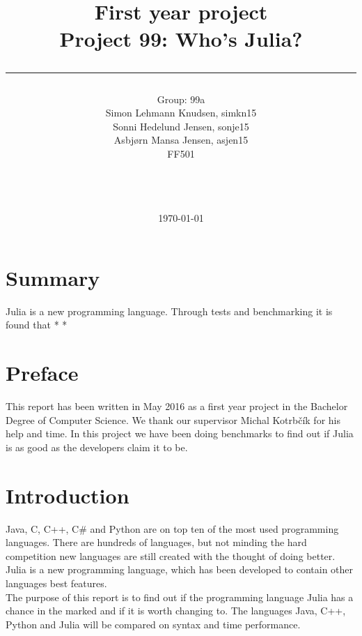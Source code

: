 \documentclass[a4paper, 11pt, titlepage]{article}
\title{First year project\\Project 99: Who's Julia?\\\rule{10cm}{0.5mm}}
\author{Group: 99a\\Simon Lehmann Knudsen, simkn15\\Sonni Hedelund Jensen, sonje15\\Asbjørn Mansa Jensen, asjen15
	\\ FF501\\\rule{5.5cm}{0.5mm}\\}
\date{\today}
\begin{document}
\maketitle

\vfill

\newpage
{}
\section{Summary}
Julia is a new programming language. Through tests and benchmarking it is found that * *

\section{Preface}
This report has been written in May 2016 as a first year project in the Bachelor Degree of Computer Science. We thank our supervisor Michal Kotrbčík for his help and time.
In this project we have been doing benchmarks to find out if Julia is as good as the developers claim it to be. 

\newpage
\tableofcontents

\newpage
{}
\pagestyle{fancy}
\fancyhf{}
\section{Introduction}
Java, C, C++, C\# and Python are on top ten of the most used programming languages. There are hundreds of languages, but not minding the hard competition new languages are still created with the thought of doing better. Julia is a new programming language, which has been developed to contain other languages best features.
\\
The purpose of this report is to find out if the programming language Julia has a chance in the marked and if it is worth changing to. The languages Java, C++, Python and Julia will be compared on syntax and time performance.  
\end{document}
